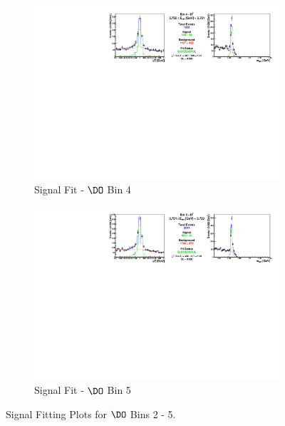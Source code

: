 \begin{figure}[h]
\begin{subfigure}[c]{0.99\textwidth}
\includegraphics[width=\textwidth]{figures/plots/fit_results/D0_bin_04.pdf}
\caption*{Signal Fit - $\DO$ Bin 4}
\end{subfigure}

\vspace{5pt}

\begin{subfigure}[c]{0.99\textwidth}
\includegraphics[width=\textwidth]{figures/plots/fit_results/D0_bin_05.pdf}
\caption*{Signal Fit - $\DO$ Bin 5}
\end{subfigure}

\caption{Signal Fitting Plots for $\DO$ Bins 2 - 5.}
\label{fig:DO_plots_2_5}

\end{figure}


